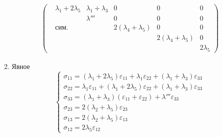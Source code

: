 \begin{enumerate}
\begin{align*}
\begin{pmatrix}
			& \lambda_1 + 2 \lambda_5 & \lambda_1+{\lambda}_3 & 0 & 0 & 0 \\
			& & {\lambda}''' & 0 & 0 & 0 \\
			& \text{сим.} & & 2({\lambda}_4+\lambda_5) & 0 & 0 \\
			& & & & 2({\lambda}_4+\lambda_5)	& 0 \\
			& & & & & 2 {\lambda}_5
		\end{pmatrix}
	\end{align*}
	\item Явное
	\[
		\begin{cases}
			\sigma_{11} = (\lambda_1+2\lambda_5)\varepsilon_{11} + \lambda_1\varepsilon_{22}+(\lambda_1+\lambda_3)\varepsilon_{33}\\
			\sigma_{22}=\lambda_1\varepsilon_{11}+(\lambda_1+2\lambda_5)\varepsilon_{22}+(\lambda_1+\lambda_3)\varepsilon_{33}\\
			\sigma_{33} = (\lambda_1+\lambda_3)(\varepsilon_{11}+\varepsilon_{22})+\lambda'''\varepsilon_{33}\\
			\sigma_{23}=2(\lambda_2+\lambda_5)\varepsilon_{23}\\
			\sigma_{13}=2(\lambda_2+\lambda_5)\varepsilon_{13}\\
			\sigma_{12}=2\lambda_5\varepsilon_{12}
		\end{cases}
	\]
\end{enumerate}

